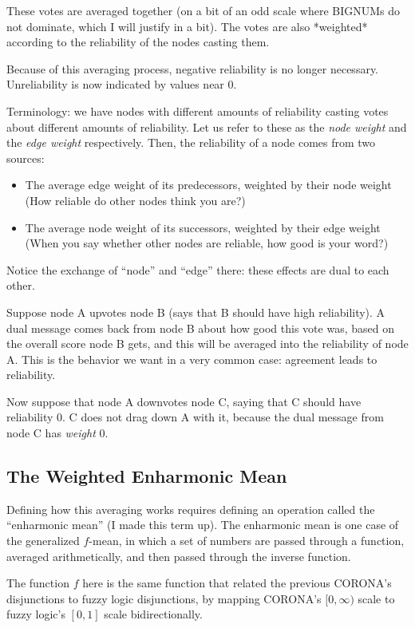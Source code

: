 \documentclass{article}
\begin{document}
These votes are averaged together (on a bit of an odd scale where BIGNUMs do
not dominate, which I will justify in a bit). The votes are also *weighted*
according to the reliability of the nodes casting them.

Because of this averaging process, negative reliability is no longer necessary.
Unreliability is now indicated by values near 0.

Terminology: we have nodes with different amounts of reliability casting votes
about different amounts of reliability. Let us refer to these as the \emph{node
weight} and the \emph{edge weight} respectively. Then, the reliability of a
node comes from two sources:

\begin{itemize}
\item The average edge weight of its predecessors, weighted by their node weight
  (How reliable do other nodes think you are?)
\item The average node weight of its successors, weighted by their edge weight
  (When you say whether other nodes are reliable, how good is your word?)
\end{itemize}

Notice the exchange of ``node'' and ``edge'' there: these effects are dual to
each other. 

Suppose node A upvotes node B (says that B should have high reliability). A
dual message comes back from node B about how good this vote was, based on the
overall score node B gets, and this will be averaged into the reliability of
node A. This is the behavior we want in a very common case: agreement leads to
reliability.

Now suppose that node A downvotes node C, saying that C should have reliability
0. C does not drag down A with it, because the dual message from node C has
\emph{weight} 0.

\subsection{The Weighted Enharmonic Mean}

Defining how this averaging works requires defining an operation called the
``enharmonic mean'' (I made this term up). The enharmonic mean is one case of
the generalized $f$-mean, in which a set of numbers are passed through a
function, averaged arithmetically, and then passed through the inverse
function.

The function $f$ here is the same function that related the previous CORONA's
disjunctions to fuzzy logic disjunctions, by mapping CORONA's $[0, \infty)$
scale to fuzzy logic's $[0, 1]$ scale bidirectionally.
\end{document}
